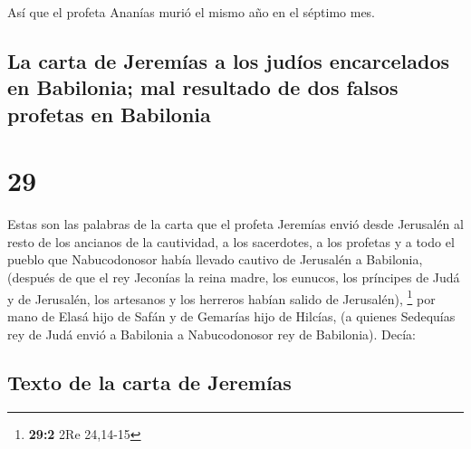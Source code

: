  Así que el profeta Ananías murió el mismo año en el
séptimo mes.

\hypertarget{la-carta-de-jeremuxedas-a-los-juduxedos-encarcelados-en-babilonia-mal-resultado-de-dos-falsos-profetas-en-babilonia}{%
\subsection{La carta de Jeremías a los judíos encarcelados en Babilonia;
mal resultado de dos falsos profetas en
Babilonia}\label{la-carta-de-jeremuxedas-a-los-juduxedos-encarcelados-en-babilonia-mal-resultado-de-dos-falsos-profetas-en-babilonia}}

\hypertarget{section-28}{%
\section{29}\label{section-28}}

 Estas son las palabras de la carta que el profeta
Jeremías envió desde Jerusalén al resto de los ancianos de la
cautividad, a los sacerdotes, a los profetas y a todo el pueblo que
Nabucodonosor había llevado cautivo de Jerusalén a Babilonia,
 (después de que el rey Jeconías la reina madre, los
eunucos, los príncipes de Judá y de Jerusalén, los artesanos y los
herreros habían salido de Jerusalén), \footnote{\textbf{29:2} 2Re
  24,14-15}  por mano de Elasá hijo de Safán y de Gemarías
hijo de Hilcías, (a quienes Sedequías rey de Judá envió a Babilonia a
Nabucodonosor rey de Babilonia). Decía:

\hypertarget{texto-de-la-carta-de-jeremuxedas}{%
\subsection{Texto de la carta de
Jeremías}\label{texto-de-la-carta-de-jeremuxedas}}

